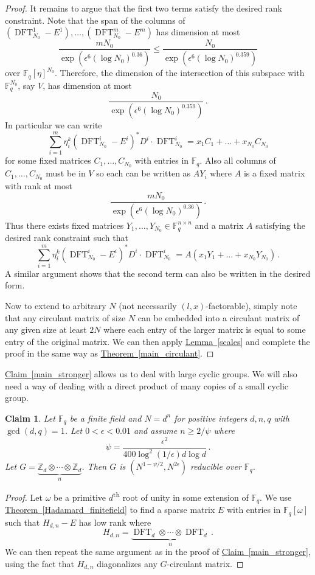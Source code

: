 \documentclass[11pt]{article}
\numberwithin{equation}{section}
\newtheorem{claim}[theorem]{Claim}
\theoremstyle{definition}
\theoremstyle{plain}
\newcommand{\Z}{\mathbb Z}
\newcommand{\expref}[2]{\hyperref[#2]{#1~\ref{#2}}}
\theoremstyle{definition}
\newcommand\F{{\mathbb{F}}}
\renewcommand\Z{{\mathbb{Z}}}
\newcommand{\ts}{\textsuperscript}
\DeclareMathOperator{\DFT}{DFT}
\begin{document}
\begin{proof}
It remains to argue that the first two terms satisfy the desired rank constraint.  Note that the span of the columns of 
%
$(\DFT_{N_0}^1 - E^1), \dots , (\DFT_{N_0}^m - E^m)$
%
has dimension at most 
\[
\frac{mN_0}{\exp\left(\epsilon^6(\log N_0)^{0.36}\right)} \leq \frac{N_0}{\exp\left(\epsilon^6(\log N_0)^{0.359}\right)}
\]
over $\F_q[\eta]^{N_0}$.  Therefore, the dimension of the intersection of this subspace with $\F_q^{N_0}$, say $V$, has dimension at most 
\[
\frac{N_0}{\exp\left(\epsilon^6(\log N_0)^{0.359}\right)} \,.
\]
In particular we can write
%
%
%
%
\[
\sum_{i=1}^m \eta_i^k(\DFT_{N_0}^i - E^i)^*D^i\cdot \DFT_{N_0}^i = x_1C_1  + \dots  + x_{N_0}C_{N_0}
\]
%
for some fixed matrices $C_1, \dots , C_{N_0}$ with entries %
in %
$\F_q$.  Also all columns of $C_1, \dots , C_{N_0}$ must be in $V$ so each can be written as $AY_i$ where $A$ is a fixed matrix with rank at most \[\frac{mN_0}{\exp\left(\epsilon^6(\log N_0)^{0.36}\right)} \,.\]  Thus there exists fixed matrices $Y_1, \dots , Y_{N_0} \in \F_q^{n \times n}$ and a matrix $A$ satisfying the desired rank constraint such that
%
%
%
%
\[
\sum_{i=1}^m \eta_i^k(\DFT_{N_0}^i - E^i)^*D^i \cdot \DFT_{N_0}^i = A(x_1Y_1 + \dots + x_{N_0}Y_{N_0}) \,.
\]
%
A similar argument shows that the second term can also be written in the desired form.

Now to extend to arbitrary $N$ (not necessarily $(l,x)$-factorable),
simply note that any circulant matrix of size $N$ can be embedded
into a circulant matrix of
any given  %
size at least $2N$ where
%
%
each entry of the larger matrix is equal to some entry %
of the original matrix.  
We can then apply \expref{Lemma}{scales} and complete the proof in the same way as \expref{Theorem}{main_circulant}.
\end{proof}


\expref{Claim}{main_stronger} allows us to deal with large cyclic groups.  We will also need a way of dealing with a direct product of many copies of a small cyclic group.  
\begin{claim}\label{smallgroups}
Let $\F_q$ be a finite field and $N = d^n$ for positive integers $d,n,q$ with $\gcd(d,q) = 1$.  Let $0 < \epsilon < 0.01 $ and assume $n \geq 2/\psi$ where \[\psi = \frac{\epsilon^2 }{400\log^2 (1/\epsilon) d \log d} \,.\]  Let $G = \underbrace{\Z_d \otimes \cdots \otimes \Z_d}_{n}$. Then $G$ is $\left(N^{1 - \psi/2},  N^{ 2\epsilon} \right)$ reducible over $\F_q$.
\end{claim}
\begin{proof}
Let $\omega$ be a primitive $d$\ts{th} root of unity in some extension of $\F_q$.  We use \expref{Theorem}{Hadamard_finitefield} to find a sparse matrix $E$ with entries in  $\F_q[\omega]$ such that $H_{d,n} - E$ has low rank where
\[
H_{d,n} = \underbrace{\DFT_d \otimes \cdots \otimes \DFT_d}_{n} \,.
\]
We can then repeat the same argument as in the proof of \expref{Claim}{main_stronger}, using the fact that $H_{d,n}$ diagonalizes any $G$-circulant matrix.
\end{proof}
\end{document}
